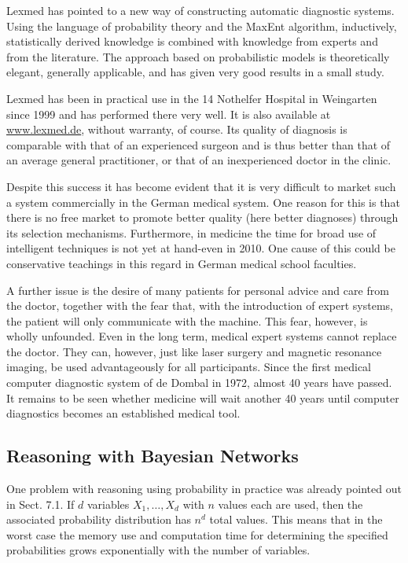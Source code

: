 \documentclass[10pt]{book}
\begin{document}
Lexmed has pointed to a new way of constructing automatic diagnostic systems. Using the language of probability theory and the MaxEnt algorithm, inductively,\\
statistically derived knowledge is combined with knowledge from experts and from the literature. The approach based on probabilistic models is theoretically elegant, generally applicable, and has given very good results in a small study.

Lexmed has been in practical use in the 14 Nothelfer Hospital in Weingarten since 1999 and has performed there very well. It is also available at \href{http://www.lexmed.de}{www.lexmed.de}, without warranty, of course. Its quality of diagnosis is comparable with that of an experienced surgeon and is thus better than that of an average general practitioner, or that of an inexperienced doctor in the clinic.

Despite this success it has become evident that it is very difficult to market such a system commercially in the German medical system. One reason for this is that there is no free market to promote better quality (here better diagnoses) through its selection mechanisms. Furthermore, in medicine the time for broad use of intelligent techniques is not yet at hand-even in 2010. One cause of this could be conservative teachings in this regard in German medical school faculties.

A further issue is the desire of many patients for personal advice and care from the doctor, together with the fear that, with the introduction of expert systems, the patient will only communicate with the machine. This fear, however, is wholly unfounded. Even in the long term, medical expert systems cannot replace the doctor. They can, however, just like laser surgery and magnetic resonance imaging, be used advantageously for all participants. Since the first medical computer diagnostic system of de Dombal in 1972, almost 40 years have passed. It remains to be seen whether medicine will wait another 40 years until computer diagnostics becomes an established medical tool.

\subsection*{Reasoning with Bayesian Networks}
One problem with reasoning using probability in practice was already pointed out in Sect. 7.1. If $d$ variables $X_{1}, \ldots, X_{d}$ with $n$ values each are used, then the associated probability distribution has $n^{d}$ total values. This means that in the worst case the memory use and computation time for determining the specified probabilities grows exponentially with the number of variables.
\end{document}
